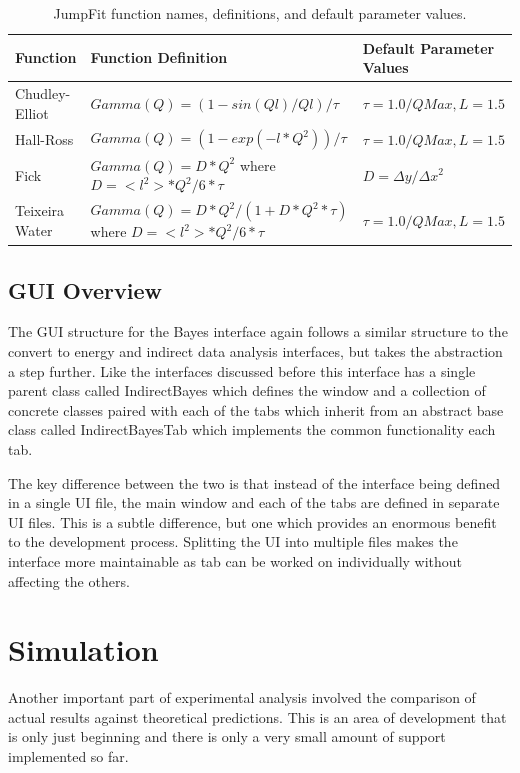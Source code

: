\documentclass[paper=a4, fontsize=11pt]{scrartcl}	%
\numberwithin{equation}{section}															%
\numberwithin{figure}{section}																%
\numberwithin{table}{section}																%
\begin{document}
\begin{table}[H]
\begin{center}
\begin{tabular}{ l l l}
Function & Function Definition & Default Parameter Values \\ \hline
Chudley-Elliot &  $Gamma(Q) = (1 - sin(Ql)/Ql)/\tau$ & $\tau = 1.0/QMax, L=1.5$\\ \hline
Hall-Ross & $ Gamma(Q) = (1-exp(-l*Q^2))/\tau$ & $\tau = 1.0/QMax, L=1.5$ \\ \hline
Fick & \parbox{6cm}{$Gamma(Q) = D*Q^2$ \\ where $D=<l^2>*Q^2/6*\tau$} & $D = \Delta y / \Delta x^2$\\ \hline
Teixeira Water & \parbox{6cm}{$Gamma(Q) = D*Q^2/(1 + D*Q^2*\tau)$ \\ where $D=<l^2>*Q^2/6*\tau$} & $\tau = 1.0/QMax, L=1.5$ \\ \hline
\end{tabular}
\caption{JumpFit function names, definitions, and default parameter values.}
\label{table:jumpfit-functions}
\end{center}
\end{table}

\subsection{GUI Overview}
\label{subsubsec:Bayes-GUI-Overview}
The GUI structure for the Bayes interface again follows a similar structure to the convert to energy and indirect data analysis interfaces, but takes the abstraction a step further. Like the interfaces discussed before this interface has a single parent class called IndirectBayes which defines the window and a collection of concrete classes paired with each of the tabs which inherit from an abstract base class called IndirectBayesTab which implements the common functionality each tab. 

The key difference between the two is that instead of the interface being defined in a single UI file, the main window and each of the tabs are defined in separate UI files. This is a subtle difference, but one which provides an enormous benefit to the development process. Splitting the UI into multiple files makes the interface more maintainable as tab can be worked on individually without affecting the others.

\section{Simulation}
\label{sec:simulation}
Another important part of experimental analysis involved the comparison of actual results against theoretical predictions. This is an area of development that is only just beginning and there is only a very small amount of support implemented so far.
\end{document}
